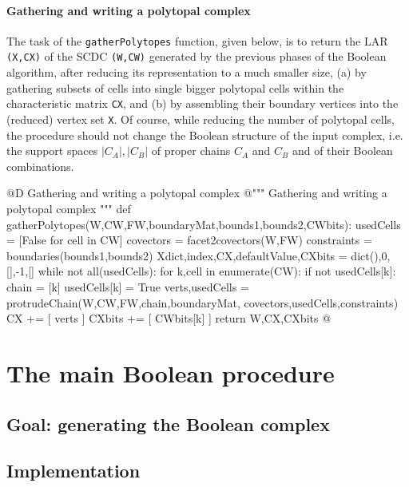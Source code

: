 \documentclass[11pt,oneside]{article}	%
\begin{document}
\paragraph{Gathering and writing a polytopal complex}
The task of the \texttt{gatherPolytopes} function, given below, is to return the LAR \texttt{(X,CX)} of the SCDC \texttt{(W,CW)} generated by the previous phases of the Boolean algorithm, after reducing its representation to a much smaller size, (a) by gathering subsets of cells into single bigger polytopal cells within the characteristic matrix \texttt{CX}, and (b) by assembling their boundary vertices into the (reduced) vertex set \texttt{X}. Of course, while reducing the number of polytopal cells, the procedure should not change the Boolean structure of the input complex, i.e. the support spaces $|C_A|, |C_B|$ of proper chains $C_A$ and $C_B$ and of their Boolean combinations.

@D Gathering and writing a polytopal complex
@{""" Gathering and writing a polytopal complex """
def gatherPolytopes(W,CW,FW,boundaryMat,bounds1,bounds2,CWbits):
	usedCells = [False for cell in CW]
	covectors = facet2covectors(W,FW)
	constraints = boundaries(bounds1,bounds2)
	Xdict,index,CX,defaultValue,CXbits = dict(),0,[],-1,[]
	while not all(usedCells):
		for k,cell in enumerate(CW):
			if not usedCells[k]:
				chain = [k]
				usedCells[k] = True
				verts,usedCells = protrudeChain(W,CW,FW,chain,boundaryMat,
									covectors,usedCells,constraints)
				CX += [ verts ]
				CXbits += [ CWbits[k] ]
	return W,CX,CXbits
@}


\section{The main Boolean procedure}

\subsection{Goal: generating the Boolean complex}


\subsection{Implementation}
\end{document}
